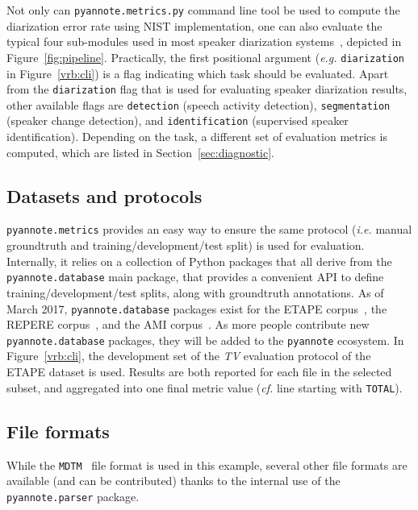 \documentclass[a4paper]{article}
\newcommand*\pyannote{\texttt{\footnotesize{pyannote}}}
\newcommand*\metrics{\texttt{\footnotesize{pyannote.metrics}}}
\newcommand*\parser{\texttt{\footnotesize{pyannote.parser}}}
\newcommand*\database{\texttt{\footnotesize{pyannote.database}}}
\newcommand*\cli{\texttt{\footnotesize{pyannote.metrics.py}}}
\begin{document}
Not only can \cli{} command line tool be used to compute the diarization error rate using NIST implementation, one can also evaluate the typical four sub-modules used in  most speaker diarization systems~\cite{anguera2012speaker}, depicted in Figure~\ref{fig:pipeline}.
Practically, the first positional argument (\emph{e.g.} \texttt{\footnotesize{diarization}} in Figure~\ref{vrb:cli}) is a flag indicating which task should be evaluated.
Apart from the \texttt{\footnotesize{diarization}} flag that is used for evaluating speaker diarization results, other available flags are \texttt{\footnotesize{detection}} (speech activity detection), \texttt{\footnotesize{segmentation}} (speaker change detection), and \texttt{\footnotesize{identification}} (supervised speaker identification).
Depending on the task, a different set of evaluation metrics is computed, which are listed in Section~\ref{sec:diagnostic}.

\subsection{Datasets and protocols}

\metrics{} provides an easy way to ensure the same protocol (\emph{i.e.} manual groundtruth and training/development/test split) is used for evaluation.
Internally, it relies on a collection of Python packages that all derive from the \database{} main package, that provides a convenient API to define training/development/test splits, along with groundtruth annotations.
As of March 2017, \database{} packages exist for the ETAPE corpus~\cite{Gravier2012}, the REPERE corpus~\cite{giraudel_repere_2012, galibert_first_2013}, and the AMI corpus~\cite{Carletta2007}.
As more people contribute new \database{} packages, they will be added to the \pyannote{} ecosystem.
In Figure~\ref{vrb:cli}, the development set of the \emph{TV} evaluation protocol of the ETAPE dataset is used.
Results are both reported for each file in the selected subset, and aggregated into one final metric value (\emph{cf.} line starting with \texttt{\footnotesize{TOTAL}}).

\subsection{File formats}

While the \texttt{MDTM}~\cite{NIST-RT03} file format is used in this example, several other file formats are available (and can be contributed) thanks to the internal use of the \parser{} package.
\end{document}
